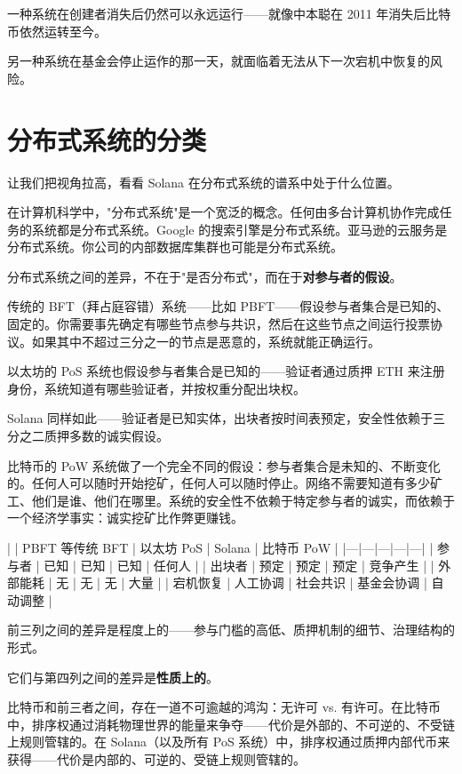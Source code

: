 \documentclass[a4paper,12pt,openany]{ctexbook}
\begin{document}
一种系统在创建者消失后仍然可以永远运行——就像中本聪在 2011 年消失后比特币依然运转至今。

另一种系统在基金会停止运作的那一天，就面临着无法从下一次宕机中恢复的风险。


\section*{分布式系统的分类}


让我们把视角拉高，看看 Solana 在分布式系统的谱系中处于什么位置。

在计算机科学中，"分布式系统"是一个宽泛的概念。任何由多台计算机协作完成任务的系统都是分布式系统。Google 的搜索引擎是分布式系统。亚马逊的云服务是分布式系统。你公司的内部数据库集群也可能是分布式系统。

分布式系统之间的差异，不在于"是否分布式"，而在于\textbf{对参与者的假设}。

传统的 BFT（拜占庭容错）系统——比如 PBFT——假设参与者集合是已知的、固定的。你需要事先确定有哪些节点参与共识，然后在这些节点之间运行投票协议。如果其中不超过三分之一的节点是恶意的，系统就能正确运行。

以太坊的 PoS 系统也假设参与者集合是已知的——验证者通过质押 ETH 来注册身份，系统知道有哪些验证者，并按权重分配出块权。

Solana 同样如此——验证者是已知实体，出块者按时间表预定，安全性依赖于三分之二质押多数的诚实假设。

比特币的 PoW 系统做了一个完全不同的假设：参与者集合是未知的、不断变化的。任何人可以随时开始挖矿，任何人可以随时停止。网络不需要知道有多少矿工、他们是谁、他们在哪里。系统的安全性不依赖于特定参与者的诚实，而依赖于一个经济学事实：诚实挖矿比作弊更赚钱。

| | PBFT 等传统 BFT | 以太坊 PoS | Solana | 比特币 PoW |
|---|---|---|---|---|
| 参与者 | 已知 | 已知 | 已知 | 任何人 |
| 出块者 | 预定 | 预定 | 预定 | 竞争产生 |
| 外部能耗 | 无 | 无 | 无 | 大量 |
| 宕机恢复 | 人工协调 | 社会共识 | 基金会协调 | 自动调整 |

前三列之间的差异是程度上的——参与门槛的高低、质押机制的细节、治理结构的形式。

它们与第四列之间的差异是\textbf{性质上的}。

比特币和前三者之间，存在一道不可逾越的鸿沟：无许可 vs. 有许可。在比特币中，排序权通过消耗物理世界的能量来争夺——代价是外部的、不可逆的、不受链上规则管辖的。在 Solana（以及所有 PoS 系统）中，排序权通过质押内部代币来获得——代价是内部的、可逆的、受链上规则管辖的。
\end{document}
